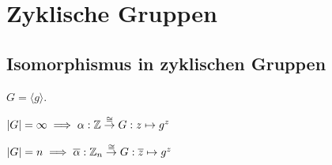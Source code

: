 \section*{Zyklische Gruppen}

\subsection*{Isomorphismus in zyklischen Gruppen}
$G = \langle g \rangle$.

$|G|=\infty \implies \alpha: \mathbb{Z} \overset{\cong}{\to} G: z \mapsto g^z$

$|G| = n \implies \overline{\alpha} : \mathbb{Z}_n \overset{\cong}{\to} G: \overline{z} \mapsto g^z$

